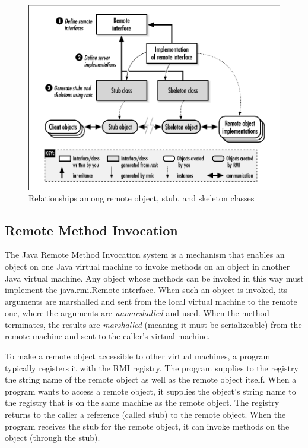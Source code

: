 \begin{figure}[ht!]
\centering
\includegraphics[width=150mm]{img/remote_object_relationship.png}
\caption{ Relationships among remote object, stub, and skeleton classes}
\label{Remote Object relationship}
\end{figure}

\subsection{Remote Method Invocation}
The Java Remote Method Invocation system is a mechanism that enables an object on one Java virtual machine to invoke methods on an object in another Java virtual machine. Any object whose methods can be invoked in this way must implement the java.rmi.Remote interface. When such an object is invoked, its arguments are marshalled and sent from the local virtual machine to the remote one, where the arguments are \emph{unmarshalled} and used. When the method terminates, the results are \emph{marshalled} (meaning it must be serializeable) from the remote machine and sent to the caller's virtual machine.

To make a remote object accessible to other virtual machines, a program typically registers it with the RMI registry. The program supplies to the registry the string name of the remote object as well as the remote object itself. When a program wants to access a remote object, it supplies the object's string name to the registry that is on the same machine as the remote object. The registry returns to the caller a reference (called stub) to the remote object. When the program receives the stub for the remote object, it can invoke methods on the object (through the stub). 